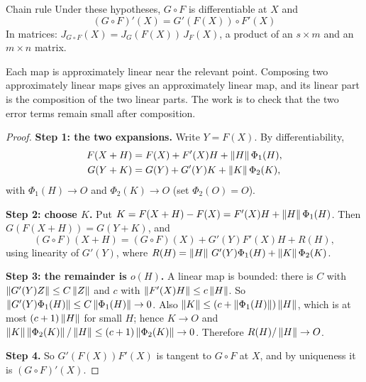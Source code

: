 \begin{theorem}[label=thm:chainmap]{Chain rule}
Under these hypotheses, $G\circ F$ is differentiable at $X$ and
\[ \boxed{\,(G\circ F)'(X)=G'(F(X))\circ F'(X)\,} \]
In matrices: $J_{G\circ F}(X)=J_G(F(X))\,J_F(X)$, a product of an $s\times m$ and an $m\times n$ matrix.
\end{theorem}

\begin{intuition}
Each map is approximately linear near the relevant point. Composing two approximately linear
maps gives an approximately linear map, and its linear part is the composition of the two linear
parts. The work is to check that the two error terms remain small after composition.
\end{intuition}

\begin{proof}
\textbf{Step 1: the two expansions.} Write $Y=F(X)$. By differentiability,
\begin{align*} F(X+H)&=F(X)+F'(X)H+\left\lVert H\right\rVert\Phi_1(H),\\ G(Y+K)&=G(Y)+G'(Y)K+\left\lVert K\right\rVert\Phi_2(K), \end{align*}
with $\Phi_1(H)\to O$ and $\Phi_2(K)\to O$ (set $\Phi_2(O)=O$).

\textbf{Step 2: choose $K$.} Put $K=F(X+H)-F(X)=F'(X)H+\left\lVert H\right\rVert\Phi_1(H)$. Then
$G(F(X+H))=G(Y+K)$, and
\[ (G\circ F)(X+H)=(G\circ F)(X)+G'(Y)F'(X)H+R(H), \]
using linearity of $G'(Y)$, where $R(H)=\left\lVert H\right\rVert\,G'(Y)\Phi_1(H)+\left\lVert K\right\rVert\Phi_2(K)$.

\textbf{Step 3: the remainder is $o(H)$.} A linear map is bounded: there is $C$ with
$\left\lVert G'(Y)Z\right\rVert\le C\left\lVert Z\right\rVert$ and $c$ with $\left\lVert F'(X)H\right\rVert\le c\left\lVert H\right\rVert$. So
$\left\lVert G'(Y)\Phi_1(H)\right\rVert\le C\left\lVert \Phi_1(H)\right\rVert\to0$. Also $\left\lVert K\right\rVert\le(c+\left\lVert \Phi_1(H)\right\rVert)\left\lVert H\right\rVert$, which is at most
$(c+1)\left\lVert H\right\rVert$ for small $H$; hence $K\to O$ and $\left\lVert K\right\rVert\left\lVert \Phi_2(K)\right\rVert/\left\lVert H\right\rVert\le(c+1)\left\lVert \Phi_2(K)\right\rVert\to0$.
Therefore $R(H)/\left\lVert H\right\rVert\to O$.

\textbf{Step 4.} So $G'(F(X))F'(X)$ is tangent to $G\circ F$ at $X$, and by uniqueness it is
$(G\circ F)'(X)$.
\end{proof}

